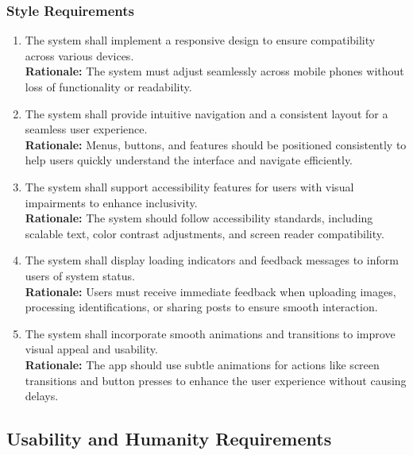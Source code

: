 \documentclass[]{article}
\begin{document}
\subsubsection{Style Requirements}
\label{ssub:style_requirements}
\begin{enumerate}[{LF-S}1. ]
	\item The system shall implement a responsive design to ensure compatibility across various devices.\\
	\textbf{Rationale:} The system must adjust seamlessly across mobile phones without loss of functionality or readability.
	\item The system shall provide intuitive navigation and a consistent layout for a seamless user experience.\\
	\textbf{Rationale:} Menus, buttons, and features should be positioned consistently to help users quickly understand the interface and navigate efficiently.
	\item The system shall support accessibility features for users with visual impairments to enhance inclusivity.\\
	\textbf{Rationale:} The system should follow accessibility standards, including scalable text, color contrast adjustments, and screen reader compatibility.
	\item The system shall display loading indicators and feedback messages to inform users of system status.\\
	\textbf{Rationale:} Users must receive immediate feedback when uploading images, processing identifications, or sharing posts to ensure smooth interaction.
	\item The system shall incorporate smooth animations and transitions to improve visual appeal and usability.\\
	\textbf{Rationale:} The app should use subtle animations for actions like screen transitions and button presses to enhance the user experience without causing delays.
\end{enumerate}


\subsection{Usability and Humanity Requirements}
\label{sub:usability_and_humanity_requirements}
\end{document}
